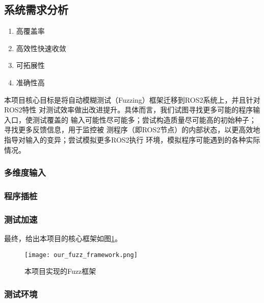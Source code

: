 \subsection{系统需求分析}
\setParDis %
\begin{enumerate}
  \item 高覆盖率
  \item 高效性快速收敛
  \item 可拓展性
  \item 准确性高
\end{enumerate}
本项目核心目标是将自动模糊测试（Fuzzing）框架迁移到ROS2系统上，并且针对ROS2特性
对测试效率做出改进提升。具体而言，我们试图寻找更多可能的程序输入口，使测试覆盖的
输入可能性尽可能多；尝试构造质量尽可能高的初始种子；寻找更多反馈信息，用于监控被
测程序（即ROS2节点）的内部状态，以更高效地指导对输入的变异；尝试模拟更多ROS2执行
环境，模拟程序可能遇到的各种实际情况。

\subsubsection{多维度输入}
\subsubsection{程序插桩}
\subsubsection{测试加速}


最终，给出本项目的核心框架如图\ref{pic:off}。

\begin{figure}[h]
    \centering
    \texttt{[image: our\_fuzz\_framework.png]}
    \caption{本项目实现的Fuzz框架}
    \label{pic:off}
\end{figure}

\subsubsection{测试环境}